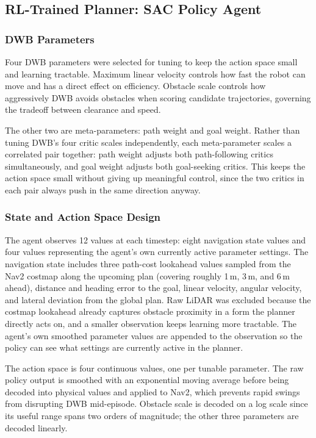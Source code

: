 \documentclass[conference]{IEEEtran}
\begin{document}
    \subsection{RL-Trained Planner: SAC Policy Agent}

        \subsubsection{DWB Parameters}
        Four DWB parameters were selected for tuning to keep the action space small and learning tractable. Maximum linear velocity controls how
        fast the robot can move and has a direct effect on efficiency. Obstacle scale controls how aggressively DWB avoids obstacles when scoring
        candidate trajectories, governing the tradeoff between clearance and speed.

        The other two are meta-parameters: path weight and goal weight. Rather than tuning DWB's four critic scales independently, each meta-parameter
        scales a correlated pair together: path weight adjusts both path-following critics simultaneously, and goal weight adjusts both goal-seeking
        critics. This keeps the action space small without giving up meaningful control, since the two critics in each pair always push in the same
        direction anyway.

        \subsubsection{State and Action Space Design}
        The agent observes 12 values at each timestep: eight navigation state values and four values representing the agent's own currently active parameter settings. The navigation state includes three path-cost lookahead values sampled from the Nav2 costmap along the upcoming plan (covering roughly 1\,m, 3\,m, and 6\,m ahead), distance and heading error to the goal, linear velocity, angular velocity, and lateral deviation from the global plan. Raw LiDAR was excluded because the costmap lookahead already captures obstacle proximity in a form the planner directly acts on, and a smaller observation keeps learning more tractable. The agent's own smoothed parameter values are appended to the observation so the policy can see what settings are currently active in the planner.

        The action space is four continuous values, one per tunable parameter. The raw policy output is smoothed with an exponential moving average before being decoded into physical values and applied to Nav2, which prevents rapid swings from disrupting DWB mid-episode. Obstacle scale is decoded on a log scale since its useful range spans two orders of magnitude; the other three parameters are decoded linearly.
\end{document}
